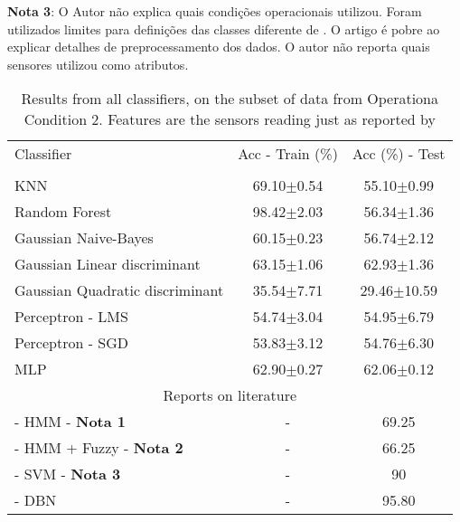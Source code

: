 \documentclass[review]{elsarticle}
\begin{document}
\textbf{Nota 3}: O Autor não explica quais condições operacionais utilizou. Foram utilizados limites para definições das classes diferente de \cite{tamilselvan2013failure}. O artigo é pobre ao explicar detalhes de preprocessamento dos dados. O autor não reporta quais sensores utilizou como atributos.


\begin{table}[!htb]
\caption{Results from all classifiers, on the subset of data from Operationa Condition 2. Features are the sensors reading just as reported by \cite{wang2008similarity}}
\centering

\begin{tabular}{lcc}
\toprule
\hline
Classifier   & Acc - Train (\%)  & Acc (\%) - Test\\ 
                      \\ \hline \hline 
KNN      			& 69.10$\pm$0.54 & 55.10$\pm$0.99 \\  
Random Forest        & 98.42$\pm$2.03 & 56.34$\pm$1.36 \\
Gaussian Naive-Bayes         & 60.15$\pm$0.23 & 56.74$\pm$2.12 \\
Gaussian Linear discriminant & 63.15$\pm$1.06 & 62.93$\pm$1.36 \\
Gaussian Quadratic discriminant & 35.54$\pm$7.71 & 29.46$\pm$10.59 \\
Perceptron - LMS & 54.74$\pm$3.04 & 54.95$\pm$6.79 \\
Perceptron - SGD & 53.83$\pm$3.12 & 54.76$\pm$6.30 \\
MLP & 62.90$\pm$0.27  & 62.06$\pm$0.12	 \\
\hline
\hline
\multicolumn{3}{c}{Reports on literature} \\
\hline
\hline
\cite{ramasso2009contribution} - HMM - \textbf{Nota 1}& -  & 69.25\\
\cite{ramasso2010prognostics} - HMM + Fuzzy - \textbf{Nota 2} & -  & 66.25\\
\cite{zhao2011comparison} - SVM - \textbf{Nota 3} & -  & 90\\
\cite{tamilselvan2013failure} - DBN & -  & 95.80 \\
\hline \hline

\bottomrule
\end{tabular}
\label{tab:clf_all}
\end{table}
\end{document}
